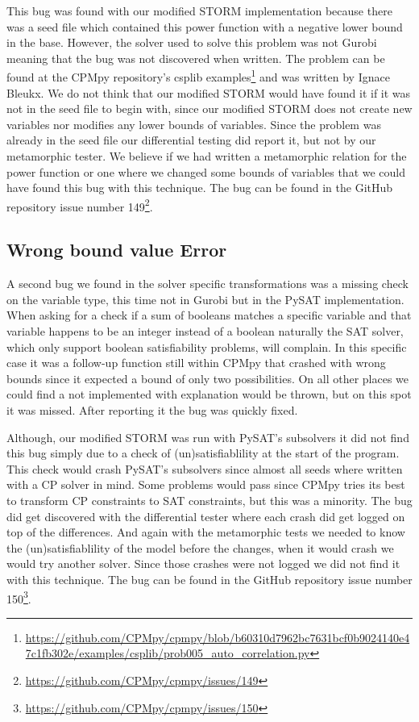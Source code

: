 This bug was found with our modified STORM implementation because there was a seed file which contained this power function with a negative lower bound in the base. However, the solver used to solve this problem was not Gurobi meaning that the bug was not discovered when written. The problem can be found at the CPMpy repository's csplib examples\footnote{\url{https://github.com/CPMpy/cpmpy/blob/b60310d7962bc7631bcf0b9024140e47c1fb302e/examples/csplib/prob005_auto_correlation.py}} and was written by Ignace Bleukx. We do not think that our modified STORM would have found it if it was not in the seed file to begin with, since our modified STORM does not create new variables nor modifies any lower bounds of variables. Since the problem was already in the seed file our differential testing did report it, but not by our metamorphic tester. We believe if we had written a metamorphic relation for the power function or one where we changed some bounds of variables that we could have found this bug with this technique. The bug can be found in the GitHub repository issue number 149\footnote{\url{https://github.com/CPMpy/cpmpy/issues/149}}.

\subsection{Wrong bound value Error}
\label{res:bug:WrongBounds}
A second bug we found in the solver specific transformations was a missing check on the variable type, this time not in Gurobi but in the PySAT implementation. When asking for a check if a sum of booleans matches a specific variable and that variable happens to be an integer instead of a boolean naturally the SAT solver, which only support boolean satisfiability problems, will complain. In this specific case it was a follow-up function still within CPMpy that crashed with wrong bounds since it expected a bound of only two possibilities. On all other places we could find a not implemented with explanation would be thrown, but on this spot it was missed. After reporting it the bug was quickly fixed.

Although, our modified STORM was run with PySAT's subsolvers it did not find this bug simply due to a check of (un)satisfiablility at the start of the program. This check would crash PySAT's subsolvers since almost all seeds where written with a CP solver in mind. Some problems would pass since CPMpy tries its best to transform CP constraints to SAT constraints, but this was a minority. The bug did get discovered with the differential tester where each crash did get logged on top of the differences. And again with the metamorphic tests we needed to know the (un)satisfiablility of the model before the changes, when it would crash we would try another solver. Since those crashes were not logged we did not find it with this technique. The bug can be found in the GitHub repository issue number 150\footnote{\url{https://github.com/CPMpy/cpmpy/issues/150}}.

